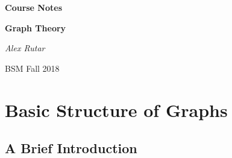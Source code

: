 \documentclass[12pt, a4paper]{book}
\theoremstyle{nonumberplain}
\newcommand{\assignmentname}{Course Notes}
\newcommand{\classname}{Graph Theory}
\newcommand{\semester}{BSM Fall 2018}
\begin{document}
\begin{titlepage}
    \centering
    \vspace{5cm}
    {\huge\textbf{\assignmentname}\par} %
    \vspace{2cm}
    {\Large\textbf{\classname}\par} %
    \vspace{3cm}
    {\Large\textit{Alex Rutar}\par}

    \vfill

    {\large \semester \par} %
\end{titlepage}
{}
\tableofcontents
{}
\chapter{Basic Structure of Graphs}
\section{A Brief Introduction}
\end{document}
